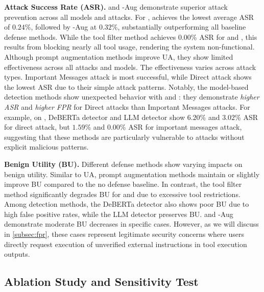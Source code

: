 \textbf{Attack Success Rate (ASR).}
\method and \method-Aug demonstrate superior attack prevention across all models and attacks. For \gpt, \method achieves the lowest average ASR of $0.24$\%, followed by \method-Aug at $0.32$\%, substantially outperforming all baseline defense methods. 
While the tool filter method achieves $0.00$\% ASR for \othree and \llama, this results from blocking nearly all tool usage, rendering the system non-functional. 
Although prompt augmentation methods improve UA, they show limited effectiveness across all attacks and models.
The effectiveness varies across attack types. Important Messages attack is most successful, while Direct attack shows the lowest ASR due to their simple attack patterns. Notably, the model-based detection methods show unexpected behavior with \othree and \llama: they demonstrate \textit{higher ASR} and \textit{higher FPR} for Direct attacks than Important Messages attacks. For example, on \llama, DeBERTa detector and LLM detector show $6.20$\% and $3.02$\% ASR for direct attack, but $1.59$\% and $0.00$\% ASR for important messages attack, suggesting that these methods are particularly vulnerable to attacks without explicit malicious patterns.


\textbf{Benign Utility (BU).}
Different defense methods show varying impacts on benign utility. Similar to UA, prompt augmentation methods maintain or slightly improve BU compared to the no defense baseline. In contrast, the tool filter method significantly degrades BU for \othree and \llama due to excessive tool restrictions. Among detection methods, the DeBERTa detector also shows poor BU due to high false positive rates, while the LLM detector preserves BU. \method and \method-Aug demonstrate moderate BU decreases in specific cases. However, as we will discuss in \cref{subsec:fpr}, these cases represent legitimate security concerns where users directly request execution of unverified external instructions in tool execution outputs.







\subsection{Ablation Study and Sensitivity Test}
\label{subsec:ablation}

